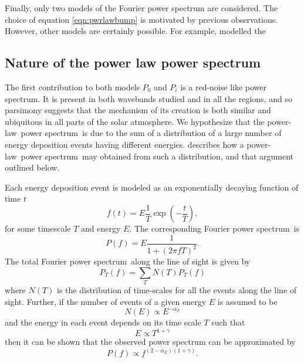 \documentclass[preprint]{../aastex52/aastex}
\newcommand{\PS}{power spectrum}
\newcommand{\PL}{power-law}
\newcommand{\Fps}{Fourier \PS}
\begin{document}
Finally, only two models of the Fourier power spectrum are considered.
The choice of equation \ref{eqn:pwrlawbump} is motivated by previous
observations.  However, other models are certainly possible.  For
example, \cite{1993ASPC...42..111H} modelled the


\subsection{Nature of the power law power spectrum}\label{ssec:nplps}
The first contribution to both models $P_{0}$ and $P_{i}$ is a
red-noise like power spectrum.  It is present in both wavebands
studied and in all the regions, and so parsimony suggests that the
mechanism of its creation is both similar and ubiquitous in all parts
of the solar atmosphere.  We hypothesize that the \PL\ \PS\ is due to
the sum of a distribution of a large number of energy deposition
events having different energies. \cite{} describes how a
\PL\ \PS\ may obtained from such a distribution, and that argument
outlined below.

Each energy deposition event is modeled as an exponentially decaying
function of time $t$
\begin{equation}
\label{eqn:expdecay}
f(t) = E \frac{1}{T}\exp\left(-\frac{t}{T}\right),
\end{equation}
for some timescale $T$ and energy $E$.  The corresponding \Fps\ is
\begin{equation}
\label{eqn:ftexpdecay}
P(f) = E\frac{1}{1 + (2\pi f T)^{2}}.
\end{equation}
The total \Fps\ along the line of sight is given by
\begin{equation}
\label{eqn:ftexpdecay}
P_{T}(f) = \sum_{T}N(T)P_{T}(f)
\end{equation}
where $N(T)$ is the distribution of time-scales for all the events
along the line of sight.  Further, if the number of events of a given
energy $E$ is assumed to be
\begin{equation}
\label{eqn:energydistrib}
N(E) \propto E^{-\alpha_{E}}
\end{equation}
and the energy in each event depends on its time scale $T$ such that
\begin{equation}
\label{eqn:energydistrib}
E \propto T^{1+\gamma}
\end{equation}
then it can be shown \cite{} that the observed power spectrum can be
approximated by
\begin{equation}
\label{eqn:energydistrib}
P(f) \propto f^{(2-\alpha_{E})(1+\gamma)}.
\end{equation}
\end{document}
